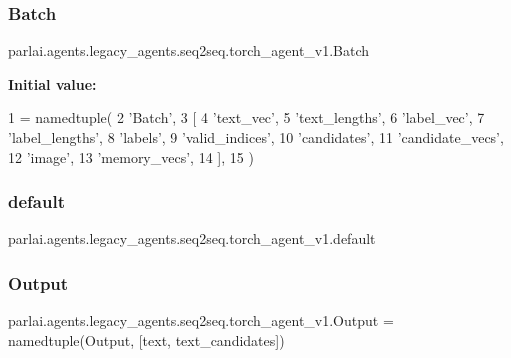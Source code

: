 \subsubsection{\texorpdfstring{Batch}{Batch}}
{\footnotesize\ttfamily parlai.\+agents.\+legacy\+\_\+agents.\+seq2seq.\+torch\+\_\+agent\+\_\+v1.\+Batch}

{\bfseries Initial value\+:}
\begin{DoxyCode}
1 =  namedtuple(
2     \textcolor{stringliteral}{'Batch'},
3     [
4         \textcolor{stringliteral}{'text\_vec'},
5         \textcolor{stringliteral}{'text\_lengths'},
6         \textcolor{stringliteral}{'label\_vec'},
7         \textcolor{stringliteral}{'label\_lengths'},
8         \textcolor{stringliteral}{'labels'},
9         \textcolor{stringliteral}{'valid\_indices'},
10         \textcolor{stringliteral}{'candidates'},
11         \textcolor{stringliteral}{'candidate\_vecs'},
12         \textcolor{stringliteral}{'image'},
13         \textcolor{stringliteral}{'memory\_vecs'},
14     ],
15 )
\end{DoxyCode}
\mbox{\label{namespaceparlai_1_1agents_1_1legacy__agents_1_1seq2seq_1_1torch__agent__v1_a5d17ee55b86a7e7ee0de4dca59bf3bdc}} 
\subsubsection{\texorpdfstring{default}{default}}
{\footnotesize\ttfamily parlai.\+agents.\+legacy\+\_\+agents.\+seq2seq.\+torch\+\_\+agent\+\_\+v1.\+default}

\mbox{\label{namespaceparlai_1_1agents_1_1legacy__agents_1_1seq2seq_1_1torch__agent__v1_a2689006ea97d09413fb242f984bd8016}} 
\subsubsection{\texorpdfstring{Output}{Output}}
{\footnotesize\ttfamily parlai.\+agents.\+legacy\+\_\+agents.\+seq2seq.\+torch\+\_\+agent\+\_\+v1.\+Output = namedtuple(\textquotesingle{}Output\textquotesingle{}, \mbox{[}\textquotesingle{}text\textquotesingle{}, \textquotesingle{}text\+\_\+candidates\textquotesingle{}\mbox{]})}

